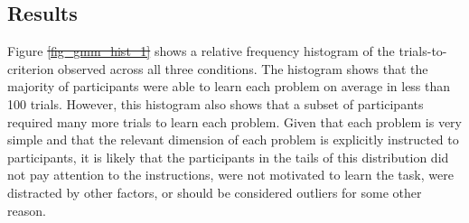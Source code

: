\documentclass[doc, floatsintext]{apa7}
\providecommand{\DIFadd}[1]{{\protect\color{blue}\uwave{#1}}} %
\providecommand{\DIFdel}[1]{{\protect\color{red}\sout{#1}}}                      %
\providecommand{\DIFaddbegin}{} %
\providecommand{\DIFaddend}{} %
\providecommand{\DIFdelbegin}{} %
\providecommand{\DIFdelend}{} %
\newcommand{\DIFscaledelfig}{0.5}
\newlength{\DIFdelgraphicswidth} %
\newlength{\DIFdelgraphicsheight} %
\newcommand{\DIFaddincludegraphics}[2][]{{\color{blue}\fbox{\DIFOincludegraphics[#1]{#2}}}} %
\newcommand{\DIFdelincludegraphics}[2][]{%
\sbox{\DIFdelgraphicsbox}{\DIFOincludegraphics[#1]{#2}}%
\settoboxwidth{\DIFdelgraphicswidth}{\DIFdelgraphicsbox} %
\settoboxtotalheight{\DIFdelgraphicsheight}{\DIFdelgraphicsbox} %
\scalebox{\DIFscaledelfig}{%
\parbox[b]{\DIFdelgraphicswidth}{\usebox{\DIFdelgraphicsbox}\\[-\baselineskip] \rule{\DIFdelgraphicswidth}{0em}}\llap{\resizebox{\DIFdelgraphicswidth}{\DIFdelgraphicsheight}{%
\setlength{\unitlength}{\DIFdelgraphicswidth}%
\begin{picture}(1,1)%
\thicklines\linethickness{2pt} %
{\color[rgb]{1,0,0}\put(0,0){\framebox(1,1){}}}%
{\color[rgb]{1,0,0}\put(0,0){\line( 1,1){1}}}%
{\color[rgb]{1,0,0}\put(0,1){\line(1,-1){1}}}%
\end{picture}%
}\hspace*{3pt}}} %
} %
\DeclareRobustCommand{\DIFaddbegin}{\DIFOaddbegin \let\includegraphics\DIFaddincludegraphics} %
\DeclareRobustCommand{\DIFaddend}{\DIFOaddend \let\includegraphics\DIFOincludegraphics} %
\DeclareRobustCommand{\DIFdelbegin}{\DIFOdelbegin \let\includegraphics\DIFdelincludegraphics} %
\DeclareRobustCommand{\DIFdelend}{\DIFOaddend \let\includegraphics\DIFOincludegraphics} %
\begin{document}
\subsection{Results}
Figure \DIFdelbegin \DIFdel{\ref{fig_gmm_hist_1} }\DIFdelend \DIFaddbegin \DIFadd{\ref{fig_mm_hist_1} }\DIFaddend shows a relative frequency
histogram of the trials-to-criterion observed across all
three conditions. The histogram shows that the majority of
participants were able to learn each problem on average in
less than 100 trials. However, this histogram also shows
that a subset of participants required many more trials to
learn each problem. Given that each problem is very simple
and that the relevant dimension of each problem is
explicitly instructed to participants, it is likely that the
participants in the tails of this distribution did not pay
attention to the instructions, were not motivated to learn
the task, were distracted by other factors, or should be
considered outliers for some other reason. 
\end{document}
